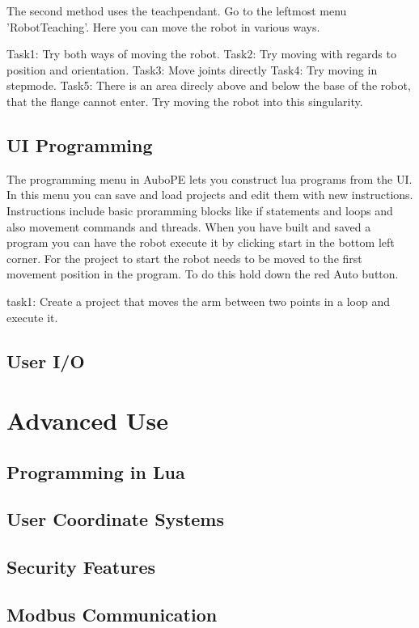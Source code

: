 \documentclass{article}
\begin{document}
The second method uses the teachpendant. Go to the leftmost menu 'RobotTeaching'. Here you can move the robot in various ways.

Task1: Try both ways of moving the robot. 
Task2: Try moving with regards to position and orientation. 
Task3: Move joints directly
Task4: Try moving in stepmode. 
Task5: There is an area direcly above and below the base of the robot, that the flange cannot enter. Try moving the robot into this singularity. 
  
\subsection{UI Programming} 

The programming menu in AuboPE lets you construct lua programs from the UI. In this menu you can save and load projects and edit them with new instructions. Instructions include basic proramming blocks like if statements and loops and also movement commands and threads. 
When you have built and saved a program you can have the robot execute it by clicking start in the bottom left corner. For the project to start the robot needs to be moved to the first movement position in the program. To do this hold down the red Auto button. 

task1: Create a project that moves the arm between two points in a loop and execute it. 

\subsection{User I/O}

\section{Advanced Use}
\subsection{Programming in Lua}
\subsection{User Coordinate Systems}
\subsection{Security Features}
\subsection{Modbus Communication}
\end{document}
